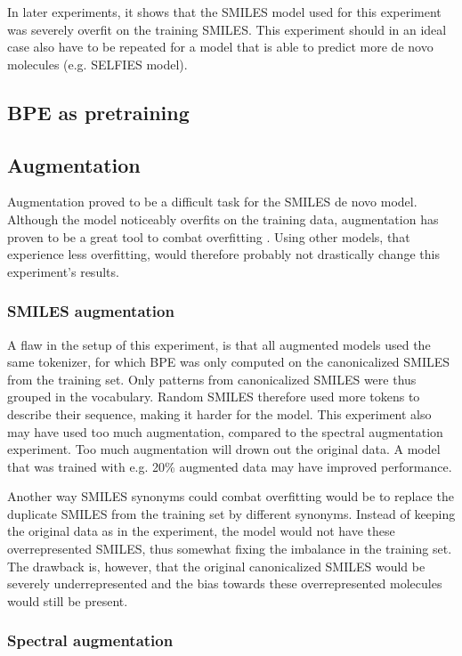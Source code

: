 In later experiments, it shows that the SMILES model used for this experiment was severely overfit on the training SMILES.
This experiment should in an ideal case also have to be repeated for a model that is able to predict more de novo molecules (e.g. SELFIES model).

\subsection{\ac{BPE} as pretraining}


\subsection{Augmentation}

Augmentation proved to be a difficult task for the SMILES de novo model.
Although the model noticeably overfits on the training data, augmentation has proven to be a great tool to combat overfitting \cite{shorten2019survey}.
Using other models, that experience less overfitting, would therefore probably not drastically change this experiment's results.

\subsubsection*{SMILES augmentation}


A flaw in the setup of this experiment, is that all augmented models used the same tokenizer, for which \ac{BPE} was only computed on the canonicalized SMILES from the training set.
Only patterns from canonicalized SMILES were thus grouped in the vocabulary.
Random SMILES therefore used more tokens to describe their sequence, making it harder for the model.
This experiment also may have used too much augmentation, compared to the spectral augmentation experiment.
Too much augmentation will drown out the original data.
A model that was trained with e.g. 20\% augmented data may have improved performance.

Another way SMILES synonyms could combat overfitting would be to replace the duplicate SMILES from the training set by different synonyms.
Instead of keeping the original data as in the experiment, the model would not have these overrepresented SMILES, thus somewhat fixing the imbalance in the training set.
The drawback is, however, that the original canonicalized SMILES would be severely underrepresented and the bias towards these overrepresented molecules would still be present.

\subsubsection*{Spectral augmentation}


